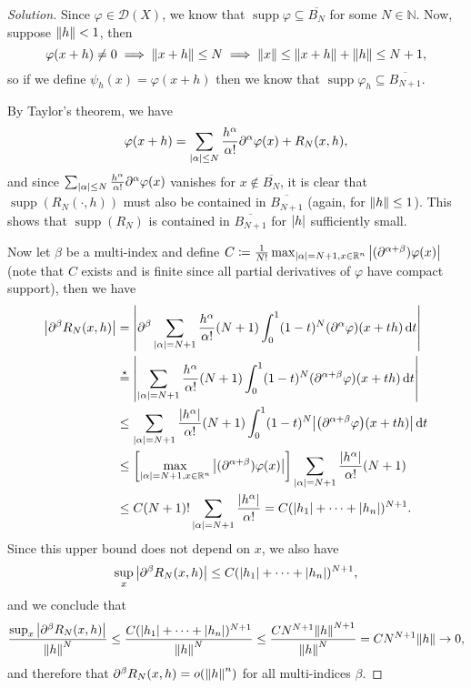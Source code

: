 \documentclass{article}
\theoremstyle{plain}
\theoremstyle{remark}
\newenvironment{solution}{\begin{proof}[Solution]\renewcommand\qedsymbol{}}{\end{proof}}
\renewcommand{\phi}{\varphi}
\newcommand{\Bb}{\mathbb}
\newcommand{\Cal}{\mathcal}
\newcommand{\NN}{\Bb N}
\newcommand{\RR}{\Bb R}
\newcommand{\DD}{\Cal D}
\newcommand\ceq\coloneqq %
\newcommand\pt\partial
\DeclareMathOperator{\supp}{supp}
\newcommand\clos\overline
\begin{document}
\begin{solution}
	Since $\phi \in \DD(X)$, we know that $\supp\phi \subseteq \clos{B_N}$ for some $N \in \NN$. Now, suppose $\norm{h} < 1$, then
	\[
	\phi(x+h) \neq 0 \implies \norm{x + h} \leq N \implies \norm{x} \leq \norm{x + h} + \norm{h} \leq N + 1, 
	\]
	so if we define $\psi_h(x) = \phi(x+h)$ then we know that $\supp\phi_h \subseteq \clos{B_{N+1}}$. 
	
	By Taylor's theorem, we have
	\[
	\phi(x+h) = \sum_{\abs{\alpha} \leq N} \frac{h^\alpha}{\alpha!} \pt^\alpha \phi(x) + R_N(x, h),  
	\]
	and since $\sum_{\abs{\alpha} \leq N} \frac{h^\alpha}{\alpha!} \pt^\alpha \phi(x)$ vanishes for $x \notin \clos{B_N}$, it is clear that $\supp(R_N(\cdot, h))$ must also be contained in $\clos{B_{N+1}}$ (again, for $\norm{h} \leq 1$). This shows that $\supp(R_N)$ is contained in $\clos{B_{N+1}}$ for $\abs{h}$ sufficiently small. 
	
	Now let $\beta$ be a multi-index and define $C \ceq \frac{1}{N!} \max_{\abs{\alpha} = N+1, x \in \RR^n} \abs{(\pt^{\alpha + \beta})\phi(x)}$ (note that $C$ exists and is finite since all partial derivatives of $\phi$ have compact support), then we have
	\begin{align*}
	\abs{\pt^\beta R_N(x, h)} &= \abs{\pt^\beta \sum_{\abs{\alpha} = N+1} \frac{h^\alpha}{\alpha!}(N+1)\int_0^1 (1-t)^N (\pt^\alpha\phi)(x + th)\dd{t}} \\
	&\overset\star= \abs{\sum_{\abs{\alpha} = N+1} \frac{h^\alpha}{\alpha!}(N+1) \int_0^1 (1-t)^N (\pt^{\alpha + \beta}\phi)(x + th)\dd{t}} \\
	&\leq \sum_{\abs{\alpha} = N+1} \frac{\abs{h^\alpha}}{\alpha!}(N+1) \int_0^1 (1-t)^N \abs{\qty(\pt^{\alpha + \beta}\phi)(x+th)} \dd{t} \\
	&\leq \qty[\max_{\abs{\alpha} = N+1, x \in \RR^n} \abs{(\pt^{\alpha + \beta})\phi(x)}] \sum_{\abs{\alpha} = N+1} \frac{\abs{h^\alpha}}{\alpha!} (N+1) \\
	&\leq C (N+1)! \sum_{\abs{\alpha}= N+1}\frac{\abs{h^\alpha}}{\alpha!} = C(\abs{h_1} + \dotsb + \abs{h_n})^{N+1}.
\end{align*}
Since this upper bound does not depend on $x$, we also have
\[
\sup_x \abs{\pt^\beta R_N(x, h)} \leq C(\abs{h_1} + \dotsb + \abs{h_n})^{N+1}, 
\]
and we conclude that
\[ 
\frac{\sup_x \abs{\pt^\beta R_N(x, h)}}{\norm{h}^N} \leq \frac{C(\abs{h_1} + \dotsb + \abs{h_n})^{N+1}}{\norm{h}^N} \leq \frac{C N^{N+1} \norm{h}^{N+1}}{\norm{h}^N} = CN^{N+1} \norm{h} \to 0, 
\]
and therefore that $\pt^\beta R_N(x, h) = o(\norm{h}^n)$ for all multi-indices $\beta$. 
\end{solution}
\end{document}
